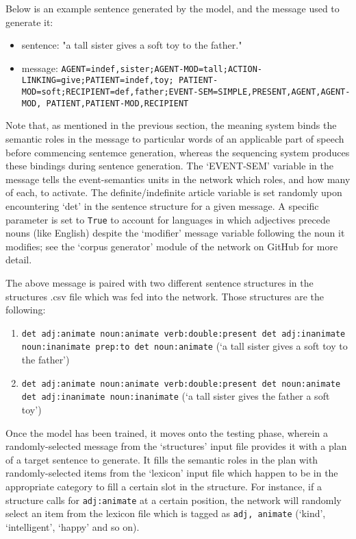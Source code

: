 \documentclass{article}
\begin{document}
Below is an example sentence generated by the model, and the message used to generate it:
\begin{itemize}
\item sentence: "a tall sister gives a soft toy to the father."
\item message: \texttt{AGENT=indef,sister;AGENT-MOD=tall;ACTION-LINKING=give;PATIENT=indef,toy;
PATIENT-MOD=soft;RECIPIENT=def,father;EVENT-SEM=SIMPLE,PRESENT,AGENT,AGENT-MOD,
PATIENT,PATIENT-MOD,RECIPIENT}
\end{itemize}
Note that, as mentioned in the previous section, the meaning system binds the semantic roles in the message to particular words of an applicable part of speech before commencing sentemce generation, whereas the sequencing system produces these bindings during sentence generation. The `EVENT-SEM' variable in the message tells the event-semantics units in the network which roles, and how many of each, to activate. The definite/indefinite article variable is set randomly upon encountering `det' in the sentence structure for a given message. A specific parameter is set to \texttt{True} to account for languages in which adjectives precede nouns (like English) despite the `modifier' message variable following the noun it modifies; see the `corpus generator' module of the network on GitHub for more detail.

The above message is paired with two different sentence structures in the structures .csv file which was fed into the network. Those structures are the following:
\begin{enumerate}
	\item \texttt{det adj:animate noun:animate verb:double:present det adj:inanimate noun:inanimate prep:to det noun:animate} (`a tall sister gives a soft toy to the father')
	\item \texttt{det adj:animate noun:animate verb:double:present det noun:animate det adj:inanimate noun:inanimate} (`a tall sister gives the father a soft toy')
\end{enumerate}

Once the model has been trained, it moves onto the testing phase, wherein a randomly-selected message from the `structures' input file provides it with a plan of a target sentence to generate. It fills the semantic roles in the plan with randomly-selected items from the `lexicon' input file which happen to be in the appropriate category to fill a certain slot in the structure. For instance, if a structure calls for \texttt{adj:animate} at a certain position, the network will randomly select an item from the lexicon file which is tagged as \texttt{adj, animate} (`kind', `intelligent', `happy' and so on).
\end{document}
